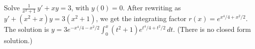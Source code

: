 {Solve $\frac{1}{x^2+1} \, y' + x y = 3$, with $y(0) = 0$.}
{After rewriting as $y'+(x^2+x)y=3(x^2+1)$, we get the integrating factor $r(x) = e^{x^4/4+x^2/2}$.\\
The solution is $y=3e^{-x^4/4-x^2/2}\int_0^x(t^2+1)e^{t^4/4+t^2/2}\,dt$. (There is no closed form solution.)}